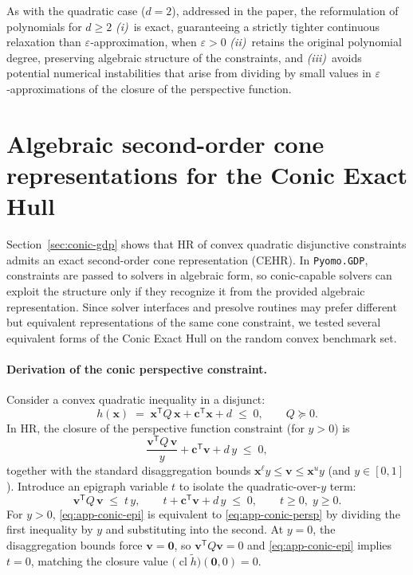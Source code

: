 \documentclass[11pt]{article}
\begin{document}
\begin{appendices}
As with the quadratic case ($d=2$), addressed in the paper, the reformulation of polynomials for $d\ge 2$
\emph{(i)}~is exact, guaranteeing a strictly tighter continuous relaxation than $\varepsilon$‐approximation, when  $\varepsilon>0$ 
\emph{(ii)}~retains the original polynomial degree, preserving
algebraic structure of the constraints, and  
\emph{(iii)}~avoids potential numerical instabilities that arise from dividing by small values in $\varepsilon$‐approximations of the closure of the perspective function.

\section{Algebraic second-order cone representations for the Conic Exact Hull}
\label{app:conic-repr}

Section~\ref{sec:conic-gdp} shows that HR of convex quadratic disjunctive constraints admits an exact second-order cone representation (CEHR).
In \texttt{Pyomo.GDP}, constraints are passed to solvers in algebraic form, so conic-capable solvers can exploit the structure only if they recognize it from the provided algebraic representation. Since solver interfaces and presolve routines may prefer different but equivalent representations of the same cone constraint, we tested several equivalent forms of the Conic Exact Hull on the random convex benchmark set.

\paragraph{Derivation of the conic perspective constraint.}
Consider a convex quadratic inequality in a disjunct:
\begin{equation}
\label{eq:app-conic-base-q}
h(\mathbf{x}) \;=\; \mathbf{x}^{\mathsf T}Q\,\mathbf{x} + \mathbf{c}^{\mathsf T}\mathbf{x} + d \;\le\; 0,
\qquad Q \succeq 0.
\end{equation}
In HR, the closure of the perspective function constraint (for $y>0$) is
\begin{equation}
\label{eq:app-conic-persp}
\frac{\mathbf{v}^{\mathsf T}Q\,\mathbf{v}}{y} + \mathbf{c}^{\mathsf T}\mathbf{v} + d\,y \;\le\; 0,
\end{equation}
together with the standard disaggregation bounds $\mathbf{x}^{\ell}y \le \mathbf{v} \le \mathbf{x}^{u}y$
(and $y\in[0,1]$). Introduce an epigraph variable $t$ to isolate the quadratic-over-$y$ term:
\begin{equation}
\label{eq:app-conic-epi}
\mathbf{v}^{\mathsf T}Q\,\mathbf{v} \;\le\; t\,y,
\qquad
t + \mathbf{c}^{\mathsf T}\mathbf{v} + d\,y \;\le\; 0,
\qquad
t \ge 0,\; y \ge 0.
\end{equation}
For $y>0$, \eqref{eq:app-conic-epi} is equivalent to \eqref{eq:app-conic-persp} by dividing the first
inequality by $y$ and substituting into the second.
At $y=0$, the disaggregation bounds force $\mathbf{v}=\mathbf{0}$, so $\mathbf{v}^{\mathsf T}Q\mathbf{v}=0$ and \eqref{eq:app-conic-epi} implies $t=0$, matching the closure value $\bigl(\operatorname{cl}\widetilde h\bigr)(\mathbf{0},0)=0$.


\end{appendices}
\end{document}
